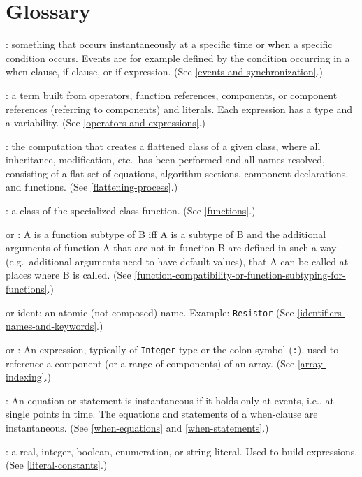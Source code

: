 \chapter{Glossary}\label{glossary}

: something that occurs instantaneously at a specific time
or when a specific condition occurs. Events are for example defined by
the condition occurring in a when clause, if clause, or if expression.
(See \cref{events-and-synchronization}.)

: a term built from operators, function references,
components, or component references (referring to components) and
literals. Each expression has a type and a variability. (See \cref{operators-and-expressions}.)

: the computation that creates a flattened class of a
given class, where all inheritance, modification, etc.\ has been
performed and all names resolved, consisting of a flat set of equations,
algorithm sections, component declarations, and functions. (See \cref{flattening-process}.)

: a class of the specialized class function. (See \cref{functions}.)

 or : A
is a function subtype of B iff A is a subtype of B and the additional
arguments of function A that are not in function B are defined in such a
way (e.g.\ additional arguments need to have default values), that A can
be called at places where B is called. (See \cref{function-compatibility-or-function-subtyping-for-functions}.)

 or ident: an atomic (not composed) name. Example:
\lstinline!Resistor! (See \cref{identifiers-names-and-keywords}.)

 or : An expression, typically of \lstinline!Integer! type or the colon symbol (\lstinline!:!), used to reference a component (or a range of components) of an array.  (See \cref{array-indexing}.)

: An equation or statement is instantaneous if it
holds only at events, i.e., at single points in time. The equations and
statements of a when-clause are instantaneous. (See \cref{when-equations} and
\cref{when-statements}.)

: a real, integer, boolean, enumeration, or string
literal. Used to build expressions. (See \cref{literal-constants}.)

